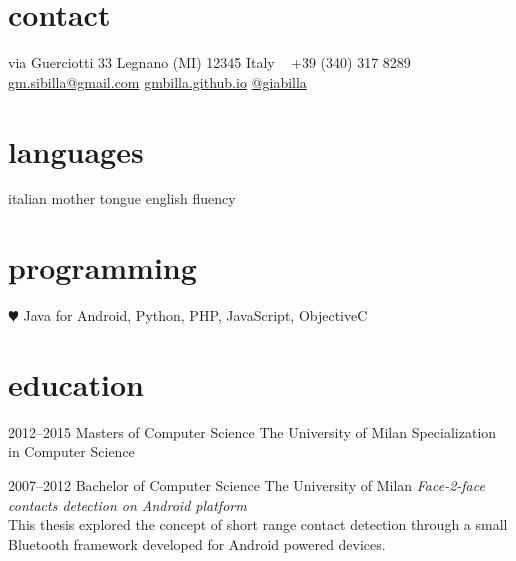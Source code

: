 \documentclass[]{friggeri-cv} %
\begin{document}


\begin{aside} %
\section{contact}
via Guerciotti 33
Legnano (MI) 12345
Italy
~
+39 (340) 317 8289
~
\href{mailto:gm.sibilla@gmail.com}{gm.sibilla@gmail.com}
\href{https://gmbilla.github.com}{gmbilla.github.io}
\href{https://twitter.com/giabilla}{@giabilla}
\section{languages}
italian mother tongue
english fluency
\section{programming}
{\color{red} $\varheartsuit$} Java for Android, Python, PHP, JavaScript, ObjectiveC
\end{aside}


\section{education}

\begin{entrylist}


\entry
{2012--2015}
{Masters {\normalfont of Computer Science}}
{The University of Milan}
{Specialization in Computer Science}


\entry
{2007--2012}
{Bachelor {\normalfont of Computer Science}}
{The University of Milan}
{\emph{Face-2-face contacts detection on Android platform} \\ This thesis explored the concept of short range contact detection through a small Bluetooth framework developed for Android powered devices.}


\end{entrylist}
\end{document}
